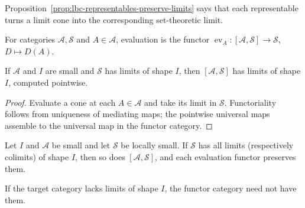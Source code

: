 \begin{remark}
\label{rem:lbc-representable-limit}
Proposition~\ref{prop:lbc-representables-preserve-limits} says that each
representable turns a limit cone into the corresponding set-theoretic limit.
\end{remark}

\begin{notation}
\label{not:lbc-evaluation}
For categories $\mathcal A,\mathcal S$ and $A\in\mathcal A$, evaluation is the
functor $\operatorname{ev}_A:[\mathcal A,\mathcal S]\to\mathcal S$,
$D\mapsto D(A)$.
\end{notation}

\begin{theorem}
\label{thm:lbc-functor-category-limits}
If $\mathcal A$ and $I$ are small and $\mathcal S$ has limits of shape $I$, then
$[\mathcal A,\mathcal S]$ has limits of shape $I$, computed pointwise.
\end{theorem}
\begin{proof}
Evaluate a cone at each $A\in\mathcal A$ and take its limit in $\mathcal S$.
Functoriality follows from uniqueness of mediating maps; the pointwise
universal maps assemble to the universal map in the functor category.
\end{proof}

\begin{corollary}
\label{cor:lbc-presheaf-complete}
Let $I$ and $\mathcal A$ be small and let $\mathcal S$ be locally small. If
$\mathcal S$ has all limits (respectively colimits) of shape $I$, then so does
$[\mathcal A,\mathcal S]$, and each evaluation functor preserves them.
\end{corollary}

\begin{warning}
\label{warn:lbc-pointwise-hypothesis}
If the target category lacks limits of shape $I$, the functor category need not
have them.
\end{warning}

